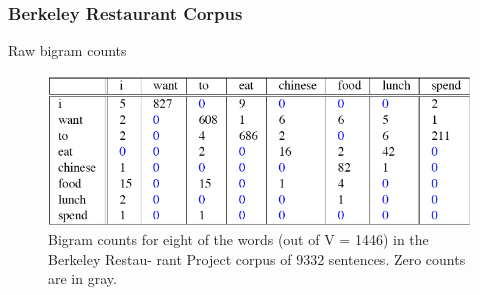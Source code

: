 \documentclass[13.5pt,aspecratio=169]{beamer}
\begin{document}
\begin{frame}
    \onehalfspacing
        \frametitle{Berkeley Restaurant Corpus}
        \begin{minipage}{0.3\textwidth}
            \begin{block}{}
                \item Raw bigram counts
            \end{block}
        \end{minipage}
        
        \bigskip
            \begin{figure}
                \centering
                \includegraphics [scale=0.6] {raw_bigram_counts.png}
                \caption{Bigram counts for eight of the words (out of V = 1446) in the Berkeley Restau-
                rant Project corpus of 9332 sentences. Zero counts are in gray.}
            \end{figure}
        
\end{frame}




\end{document}
